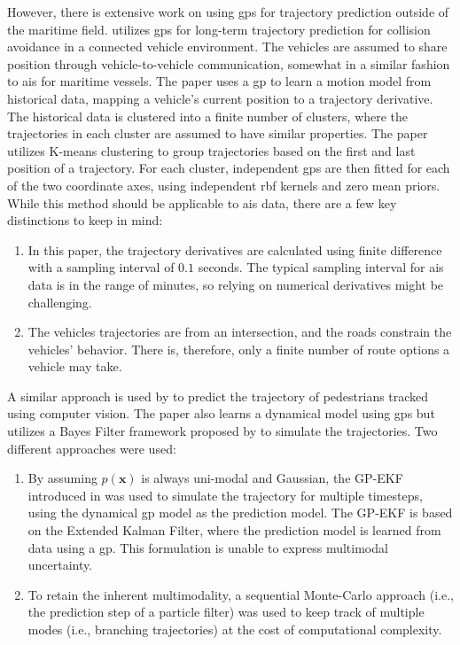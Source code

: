 However, there is extensive  work on using \acrshort{gp}s for trajectory prediction outside of the maritime field. \citeauthor{vehicle_gp_prediction} \cite{vehicle_gp_prediction} utilizes \acrshort{gp}s for long-term trajectory prediction for collision avoidance in a connected vehicle environment. The vehicles are assumed to share position through vehicle-to-vehicle communication, somewhat in a similar fashion to \acrshort{ais} for maritime vessels. The paper uses a \acrshort{gp} to learn a motion model from historical data, mapping a vehicle's current position to a trajectory derivative. The historical data is clustered into a finite number of clusters, where the trajectories in each cluster are assumed to have similar properties. The paper utilizes K-means clustering \cite{murphy} to group trajectories based on the first and last position of a trajectory. For each cluster, independent \acrshort{gp}s are then fitted for each of the two coordinate axes, using independent \acrshort{rbf} kernels and zero mean priors. While this method should be applicable to \acrshort{ais} data, there are a few key distinctions to keep in mind:
\begin{enumerate}
    \item In this paper, the trajectory derivatives are calculated using finite difference with a sampling interval of $0.1$ seconds. The typical sampling interval for \acrshort{ais} data is in the range of minutes, so relying on numerical derivatives might be challenging.
    \item The vehicles trajectories are from an intersection, and the roads constrain the vehicles' behavior. There is, therefore, only a finite number of route options a vehicle may take.
\end{enumerate}

A similar approach is used by \citeauthor{pedestrian} \cite{pedestrian} to predict the trajectory of pedestrians tracked using computer vision. The paper also learns a dynamical model using \acrshort{gp}s but utilizes a Bayes Filter framework proposed by \citeauthor{gpekf} \cite{gpekf} to simulate the trajectories. Two different approaches were used:
\begin{enumerate}
    \item By assuming $p(\boldsymbol{x})$ is always uni-modal and Gaussian, the GP-EKF introduced in \cite{gpekf} was used to simulate the trajectory for multiple timesteps, using the dynamical \acrshort{gp} model as the prediction model. The GP-EKF is based on the Extended Kalman Filter, where the prediction model is learned from data using a \acrshort{gp}. This formulation is unable to express multimodal uncertainty.
    \item To retain the inherent multimodality, a sequential Monte-Carlo approach (i.e., the prediction step of a particle filter) was used to keep track of multiple modes (i.e., branching trajectories) at the cost of computational complexity.  
\end{enumerate}

